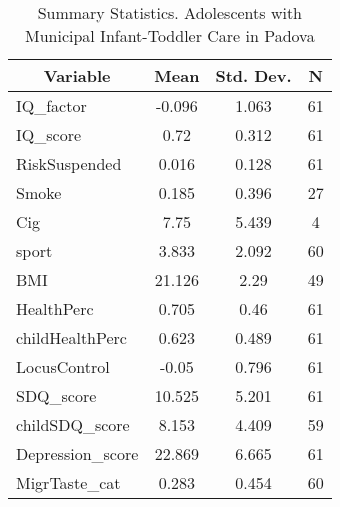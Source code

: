 
\begin{table}[htbp]\centering \caption{Summary Statistics. Adolescents with Municipal Infant-Toddler Care in Padova \label{bothAdolasiloMuniPadova}}
\begin{tabular}{l c c  c}\hline\hline
\multicolumn{1}{c}{\textbf{Variable}} & \textbf{Mean}
 & \textbf{Std. Dev.} & \textbf{N}\\ \hline
IQ\_factor & -0.096 & 1.063  & 61\\
IQ\_score & 0.72 & 0.312  & 61\\
RiskSuspended & 0.016 & 0.128  & 61\\
Smoke & 0.185 & 0.396  & 27\\
Cig & 7.75 & 5.439  & 4\\
sport & 3.833 & 2.092  & 60\\
BMI & 21.126 & 2.29  & 49\\
HealthPerc & 0.705 & 0.46  & 61\\
childHealthPerc & 0.623 & 0.489  & 61\\
LocusControl & -0.05 & 0.796  & 61\\
SDQ\_score & 10.525 & 5.201  & 61\\
childSDQ\_score & 8.153 & 4.409  & 59\\
Depression\_score & 22.869 & 6.665  & 61\\
MigrTaste\_cat & 0.283 & 0.454  & 60\\
\hline\end{tabular}
\end{table}
